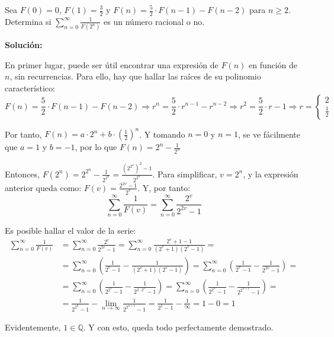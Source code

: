 \documentclass[../../main.tex]{subfiles}
\begin{document}
  \begin{shaded}
    Sea $F(0) = 0$, $F(1) = \displaystyle\frac{3}{2}$ y $F(n) = \displaystyle\frac{5}{2} \cdot F(n - 1) - F(n - 2)$ para $n \geq 2$. Determina si $\displaystyle\sum_{n = 0}^\infty \frac{1}{F\left(2^n\right)}$ es un número racional o no.
  \end{shaded}

  \textbf{Solución:}

  En primer lugar, puede ser útil encontrar una expresión de $F(n)$ en función de $n$, sin recurrencias. Para ello, hay que hallar las raíces de su polinomio característico:
  $$
  F(n) = \frac{5}{2} \cdot F(n - 1) - F(n - 2) \Longrightarrow r^n = \frac{5}{2} \cdot r^{n - 1} - r^{n - 2} \Longrightarrow r^2 = \frac{5}{2} \cdot r - 1 \Longrightarrow r = \left\{ \begin{matrix} 2 \\ \textstyle\frac{1}{2} \end{matrix} \right .
  $$

  Por tanto, $F(n) = a \cdot 2^n + b \cdot \left(\displaystyle\frac{1}{2}\right)^n$. Y tomando $n = 0$ y $n = 1$, se ve fácilmente que $a = 1$ y $b = -1$, por lo que $F(n) = 2^n - \displaystyle\frac{1}{2^n}$

  Entonces, $F(2^n) = 2^{2^n} - \displaystyle\frac{1}{2^{2^n}} = \displaystyle\frac{\left(2^{2^n}\right)^2 - 1}{2^{2^n}}$. Para simplificar, $v = 2^n$, y la expresión anterior queda como: $F(v) = \displaystyle\frac{2^{2v} - 1}{2^v}$. Y, por tanto:
  $$
  \sum_{n = 0}^\infty \frac{1}{F(v)} = \sum_{n = 0}^\infty \frac{2^v}{2^{2v} - 1}
  $$

  Es posible hallar el valor de la serie:
  \begin{equation*}
    \begin{split}
      \sum_{n = 0}^\infty \frac{1}{F(v)} & =
      \sum_{n = 0}^\infty \frac{2^v}{2^{2v} - 1} = \sum_{n = 0}^\infty \frac{2^v + 1 - 1}{(2^v + 1)(2^v - 1)} = \\ & =
      \sum_{n = 0}^\infty \left(\frac{1}{2^v - 1} - \frac{1}{(2^v + 1)(2^v - 1)}\right) = \sum_{n = 0}^\infty \left(\frac{1}{2^v - 1} - \frac{1}{2^{2v} - 1}\right) = \\ & =
      \sum_{n = 0}^\infty \left(\frac{1}{2^{2^n} - 1} - \frac{1}{2^{2 \cdot 2^n} - 1}\right) = \sum_{n = 0}^\infty \left(\frac{1}{2^{2^n} - 1} - \frac{1}{2^{2^{n + 1}} - 1}\right) = \\ & =
      \frac{1}{2^{2^0} - 1} - \lim_{n \to \infty} \frac{1}{2^{2^{n + 1}} - 1} = \frac{1}{2^1 - 1} - \frac{1}{\infty} = 1 - 0 = 1
    \end{split}
  \end{equation*}

  Evidentemente, $1 \in \mathbb{Q}$. Y con esto, queda todo perfectamente demostrado.
\end{document}
